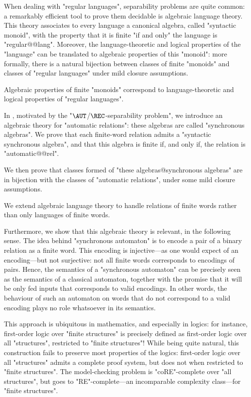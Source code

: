 When dealing with "regular languages",
separability problems are quite common: a remarkably efficient tool
to prove them decidable is algebraic language theory.
This theory associates to every language a canonical algebra, called "syntactic monoid",
with the property that it is finite "if and only" the language is "regular@@lang".
Moreover, the language-theoretic and logical properties of the "language" can be
translated to algebraic properties of this "monoid": more formally, there is a natural
bijection between classes of finite "monoids" and classes of
"regular languages" under mild closure assumptions.

\begin{known}
	Algebraic properties of finite "monoids" correspond to
	language-theoretic and logical properties of "regular languages".
\end{known}

In , motivated by the "$\AUT$/$\REC$-separability problem",
we introduce an algebraic theory for "automatic relations": these algebras are called
"synchronous algebras".
We prove that each finite-word relation admits a "syntactic synchronous algebra",
and that this algebra is finite if, and only if, the relation is "automatic@@rel".

We then prove that classes formed of "these algebras@synchronous algebras" 
are in bijection with the classes of "automatic relations", under some mild closure
assumptions. 

\begin{contribution}
	We extend algebraic language theory to handle relations of finite words
	rather than only languages of finite words.
\end{contribution}

Furthermore, we show that this algebraic theory is relevant, in the following sense.
The idea behind "synchronous automaton" is to encode a pair of a binary relation as
a finite word. This encoding is injective---as one would expect of an encoding---but not
surjective: not all finite words corresponds to encodings of pairs.
Hence, the semantics of a "synchronous automaton" can be precisely seen
as the semantics of a classical automaton, together with the promise that it will be only
fed inputs that corresponds to valid encodings. In other words,
the behaviour of such an automaton on words that do not correspond to a valid encoding
plays no role whatsoever in its semantics.

This approach is ubiquitous in mathematics, and especially in logics:
for instance, first-order logic over "finite structures" is precisely
defined as first-order logic over all "structures", restricted to "finite structures"!
While being quite natural, this construction fails to preserve most properties of the logics:
first-order logic over all "structures" admits a complete proof system,
but does not when restricted to "finite structures". The model-checking problem
is "coRE"-complete over "all structures", but goes to
"RE"-complete---an incomparable complexity class---for "finite structures".

